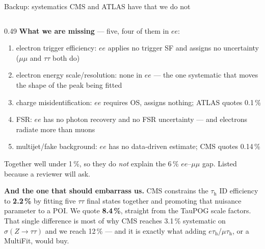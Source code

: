 \documentclass[aspectratio=169,9pt,t]{beamer}
\newcommand{\tauh}{\ensuremath{\tau_{\mathrm{h}}}}
\newcommand{\ee}{\ensuremath{ee}}
\begin{document}
\begin{frame}[noframenumbering]{Backup: systematics CMS and ATLAS have that we do not}
\begin{columns}[T]
\begin{column}{0.49\textwidth}\footnotesize
\textbf{What we are missing} --- five, four of them in $\ee$:
\begin{enumerate}\setlength\itemsep{1pt}
\item \alert{electron trigger efficiency}: $\ee$ applies no trigger SF and assigns no uncertainty
      ($\mu\mu$ and $\tau\tau$ both do)
\item \alert{electron energy scale/resolution}: none in $\ee$ --- the one systematic that moves the
      shape of the peak being fitted
\item \alert{charge misidentification}: $\ee$ requires OS, assigns nothing; ATLAS quotes 0.1\,\%
\item \alert{FSR}: $\ee$ has no photon recovery and no FSR uncertainty --- and electrons radiate
      more than muons
\item \alert{multijet/fake background}: $\ee$ has no data-driven estimate; CMS quotes 0.14\,\%
\end{enumerate}
Together well under 1\,\%, so they do \emph{not} explain the 6\,\% $ee$--$\mu\mu$ gap. Listed
because a reviewer will ask.

\medskip
\textbf{And the one that should embarrass us.} CMS constrains the \tauh{} ID efficiency to
\textbf{2.2\,\%} by fitting five $\tau\tau$ final states together and promoting that nuisance
parameter to a POI. We quote \textbf{8.4\,\%}, straight from the TauPOG scale factors. That single
difference is most of why CMS reaches 3.1\,\% systematic on $\sigma(Z\to\tau\tau)$ and we reach
12\,\% --- and it is exactly what adding $e\tauh$/$\mu\tauh$, or a MultiFit, would buy.
\end{column}
\end{columns}
\end{frame}
\end{document}
